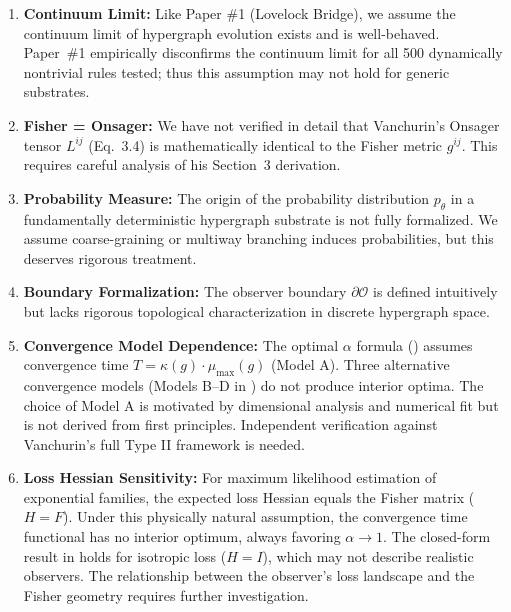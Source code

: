 \documentclass[11pt,a4paper]{article}
\theoremstyle{plain}
\theoremstyle{definition}
\theoremstyle{remark}
\newcommand{\Ocal}{\mathcal{O}}
\newcommand{\boundary}{\partial}
\begin{document}
\begin{enumerate}[noitemsep]
\item \textbf{Continuum Limit:} Like Paper \#1 (Lovelock Bridge), we assume the continuum limit of hypergraph evolution exists and is well-behaved. Paper~\#1 empirically disconfirms the continuum limit for all 500 dynamically nontrivial rules tested; thus this assumption may not hold for generic substrates.

\item \textbf{Fisher = Onsager:} We have not verified in detail that Vanchurin's Onsager tensor $L^{ij}$ (Eq.~3.4) is mathematically identical to the Fisher metric $g^{ij}$. This requires careful analysis of his Section~3 derivation.

\item \textbf{Probability Measure:} The origin of the probability distribution $p_\theta$ in a fundamentally deterministic hypergraph substrate is not fully formalized. We assume coarse-graining or multiway branching induces probabilities, but this deserves rigorous treatment.

\item \textbf{Boundary Formalization:} The observer boundary $\boundary \Ocal$ is defined intuitively but lacks rigorous topological characterization in discrete hypergraph space.

\item \textbf{Convergence Model Dependence:} The optimal $\alpha$ formula () assumes convergence time $T = \kappa(g) \cdot \mu_{\max}(g)$ (Model A). Three alternative convergence models (Models B--D in ) do not produce interior optima. The choice of Model A is motivated by dimensional analysis and numerical fit but is not derived from first principles. Independent verification against Vanchurin's full Type II framework is needed.

\item \textbf{Loss Hessian Sensitivity:} For maximum likelihood estimation of exponential families, the expected loss Hessian equals the Fisher matrix ($H = F$). Under this physically natural assumption, the convergence time functional has no interior optimum, always favoring $\alpha \to 1$. The closed-form result in  holds for isotropic loss ($H = I$), which may not describe realistic observers. The relationship between the observer's loss landscape and the Fisher geometry requires further investigation.
\end{enumerate}
\end{document}
